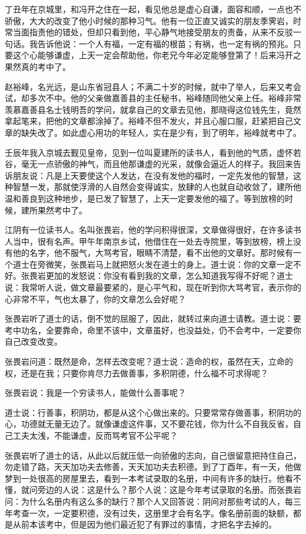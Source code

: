 \documentclass[12pt,twoside,openany]{book}
\begin{document}
丁丑年在京城里，和冯开之住在一起，看见他总是虚心自谦，面容和顺，一点也不骄傲，大大的改变了他小时候的那种习气。他有一位正直又诚实的朋友季霁岩，时常当面指责他的错处，但却只看到他，平心静气地接受朋友的责备，从来不反驳一句话。我告诉他说：一个人有福，一定有福的根苗；有祸，也一定有祸的预兆。只要这个心能够谦虚，上天一定会帮助他，你老兄今年必定能够登第了！后来冯开之果然真的考中了。

赵裕峰，名光远，是山东省冠县人；不满二十岁的时候，就中了举人，后来又考会试，却多次不中。他的父亲做嘉善县的主任秘书，裕峰随同他父亲上任。裕峰非常羡慕嘉善县名士钱明吾的学问，就拿自己的文章去见他，那晓得这位钱先生，竟然拿起笔来，把他的文章都涂掉了。裕峰不但不发火，并且心服口服，赶紧把自己文章的缺失改了。如此虚心用功的年轻人，实在是少有，到了明年，裕峰就考中了。

壬辰年我入京城去觐见皇帝，见到一位叫夏建所的读书人，看到他的气质，虚怀若谷，毫无一点骄傲的神气，而且他那谦虚的光采，就像会逼近人的样子。我回来告诉朋友说：凡是上天要使这个人发达，在没有发他的福时，一定先发他的智慧，这种智慧一发，那就使浮滑的人自然会变得诚实，放肆的人也就自动收敛了，建所他温和善良到这种地步，是已发了智慧了，上天一定要发他的福了。等到放榜的时候，建所果然考中了。

江阴有一位读书人。名叫张畏岩，他的学问积得很深，文章做得很好，在许多读书人当中，很有名声。甲午年南京乡试，他借住在一处去寺院里，等到放榜，榜上没有他的名字，他不服气，大骂考官，眼睛不清楚，看不出他的文章好。那时候有一个道士在旁微笑，张畏岩马上就把怒火发在道士的身上。道士说：你的文章一定不好。张畏岩更加的发怒说：你没有看到我的文章，怎么知道我写得不好呢？道士说：我常听人说，做文章最要紧的，是心平气和，现在听到你大骂考官，表示你的心非常不平，气也太暴了，你的文章怎么会好呢？

张畏岩听了道士的话，倒不觉的屈服了，因此，就转过来向道士请教。道士说：要考中功名，全要靠命，命里不该中，文章虽好，也没益处，仍不会考中，一定要你自己改变改变。

张畏岩问道：既然是命，怎样去改变呢？道士说：造命的权，虽然在天，立命的权，还是在我；只要你肯尽力去做善事，多积阴德，什么福不可求得呢？

张畏岩说：我是一个穷读书人，能做什么善事呢？

道士说：行善事，积阴功，都是从这个心做出来的。只要常常存做善事，积阴功的心，功德就无量无边了。就像谦虚这件事，又不要花钱，你为什么不自我反省，自己工夫太浅，不能谦虚，反而骂考官不公平呢？

张畏岩听了道士的话，从此以后就压低一向骄傲的志向，自己很留意把持住自己，勿走错了路，天天加功夫去修善，天天加功夫去积德。到了丁酉年，有一天，他做梦到一处很高的房屋里去，看到一本考试录取的名册，中间有许多的缺行。他看不懂，就问旁边的人说：这是什么？那个人说：这是今年考试录取的名册。而张畏岩问：为什么名册内有这么多的缺行？那个人又回答说：阴间对那些考试的人，每三年考查一次，一定要积德，没有过失，这册里才会有名字。像名册前面的缺额，都是从前本该考中，但是因为他们最近犯了有罪过的事情，才把名字去掉的。
\end{document}
